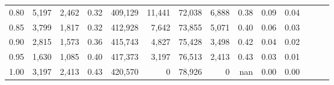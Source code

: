 \begin{tabular}{rrrrrrrrrrrrrr}
0.80 &   5,197 &  2,462 &  0.32 &  409,129 &   11,441 &  72,038 &   6,888 &  0.38 &  0.09 &      0.04 \\
0.85 &   3,799 &  1,817 &  0.32 &  412,928 &    7,642 &  73,855 &   5,071 &  0.40 &  0.06 &      0.03 \\
0.90 &   2,815 &  1,573 &  0.36 &  415,743 &    4,827 &  75,428 &   3,498 &  0.42 &  0.04 &      0.02 \\
0.95 &   1,630 &  1,085 &  0.40 &  417,373 &    3,197 &  76,513 &   2,413 &  0.43 &  0.03 &      0.01 \\
1.00 &   3,197 &  2,413 &  0.43 &  420,570 &        0 &  78,926 &       0 &   nan &  0.00 &      0.00 \\
\bottomrule
\end{tabular}
